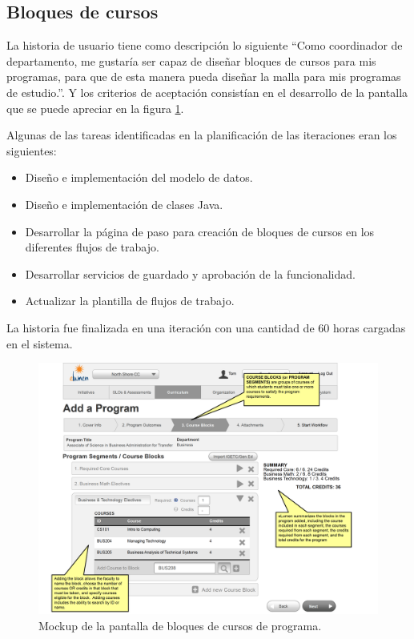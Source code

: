 \subsection{Bloques de cursos}
La historia de usuario tiene como descripción lo siguiente \enquote{Como coordinador de departamento, me gustaría ser capaz de diseñar bloques de cursos para mis programas, para que de esta manera pueda diseñar la malla para mis programas de estudio.}. Y los criterios de aceptación consistían en el desarrollo de la pantalla que se puede apreciar en la figura \ref{program_course_blocks}.

Algunas de las tareas identificadas en la planificación de las iteraciones eran los siguientes:
\begin{itemize}
	\item Diseño e implementación del modelo de datos.
	\item Diseño e implementación de clases Java.
	\item Desarrollar la página de paso para creación de bloques de cursos en los diferentes flujos de trabajo.
	\item Desarrollar servicios de guardado y aprobación de la funcionalidad.
	\item Actualizar la plantilla de flujos de trabajo.
\end{itemize}

La historia fue finalizada en una iteración con una cantidad de 60 horas cargadas en el sistema.

\begin{figure}[H]
\centering
\includegraphics[width=125mm,scale=1]{Capitulos/DesarrollodelaAplicacion/Imagenes/program_course_blocks}
\caption{Mockup de la pantalla de bloques de cursos de programa.}
  \label{program_course_blocks}
\end{figure}

